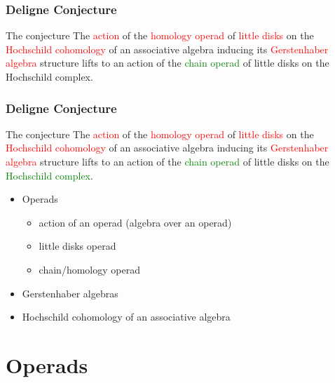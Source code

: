 \documentclass{beamer}
\theoremstyle{definition}
\begin{document}
\begin{frame}
	\frametitle{Deligne Conjecture}
	\begin{block}{The conjecture}
		The \textcolor{red}{action} of the \textcolor{red}{homology operad} of \textcolor{red}{little disks} on the \textcolor{red}{Hochschild cohomology} of an associative algebra inducing its \textcolor{red}{Gerstenhaber algebra} structure lifts to an action of the \textcolor{green}{chain operad} of little disks on the Hochschild complex.
	\end{block}
\end{frame}

\begin{frame}
	\frametitle{Deligne Conjecture}
	\begin{block}{The conjecture}
		The \textcolor{red}{action} of the \textcolor{red}{homology operad} of \textcolor{red}{little disks} on the \textcolor{red}{Hochschild cohomology} of an associative algebra inducing its \textcolor{red}{Gerstenhaber algebra} structure lifts to an action of the \textcolor{green}{chain operad} of little disks on the \textcolor{green}{Hochschild complex}.
	\end{block}
\end{frame}



\begin{frame}
	\begin{itemize}
		\item Operads
		\begin{itemize}
			\item action of an operad (algebra over an operad)
			\item little disks operad
			\item chain/homology operad			
		\end{itemize}
	\item Gerstenhaber algebras
	\item Hochschild cohomology of an associative algebra
	\end{itemize}
\end{frame}

\section{Operads}
\end{document}
